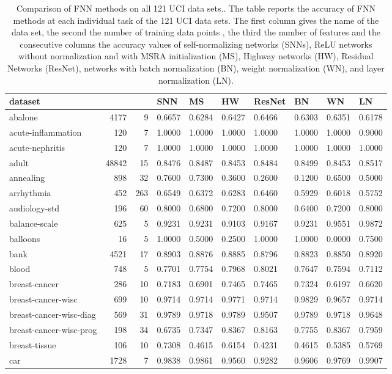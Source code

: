 \documentclass{article}
\begin{document}
\begin{table}
\caption[Comparison of FNN methods on all 121 UCI data sets.]{Comparison of FNN methods on all 121 UCI data sets.. The table reports the accuracy of FNN methods at each individual 
task of the 121 UCI data sets. The first column gives the name of the data set, the second the number
of training data points , the third the number of features  and the consecutive columns the accuracy values of
self-normalizing networks (SNNs), ReLU networks without normalization and with MSRA initialization (MS),
Highway networks (HW), Residual Networks (ResNet), networks with batch normalization (BN), weight 
normalization (WN), and layer normalization (LN). \label{tab:UCIfull}}
\footnotesize
\begin{tabular}{lrrlllllll}
\toprule
dataset &  &  & SNN & MS & HW & ResNet & BN & WN & LN\tabularnewline
\midrule
abalone & 4177 & 9 & 0.6657 & 0.6284 & 0.6427 & 0.6466 & 0.6303 & 0.6351 & 0.6178\tabularnewline
acute-inflammation & 120 & 7 & 1.0000 & 1.0000 & 1.0000 & 1.0000 & 1.0000 & 1.0000 & 0.9000\tabularnewline
acute-nephritis & 120 & 7 & 1.0000 & 1.0000 & 1.0000 & 1.0000 & 1.0000 & 1.0000 & 1.0000\tabularnewline
adult & 48842 & 15 & 0.8476 & 0.8487 & 0.8453 & 0.8484 & 0.8499 & 0.8453 & 0.8517\tabularnewline
annealing & 898 & 32 & 0.7600 & 0.7300 & 0.3600 & 0.2600 & 0.1200 & 0.6500 & 0.5000\tabularnewline
arrhythmia & 452 & 263 & 0.6549 & 0.6372 & 0.6283 & 0.6460 & 0.5929 & 0.6018 & 0.5752\tabularnewline
audiology-std & 196 & 60 & 0.8000 & 0.6800 & 0.7200 & 0.8000 & 0.6400 & 0.7200 & 0.8000\tabularnewline
balance-scale & 625 & 5 & 0.9231 & 0.9231 & 0.9103 & 0.9167 & 0.9231 & 0.9551 & 0.9872\tabularnewline
balloons & 16 & 5 & 1.0000 & 0.5000 & 0.2500 & 1.0000 & 1.0000 & 0.0000 & 0.7500\tabularnewline
bank & 4521 & 17 & 0.8903 & 0.8876 & 0.8885 & 0.8796 & 0.8823 & 0.8850 & 0.8920\tabularnewline
blood & 748 & 5 & 0.7701 & 0.7754 & 0.7968 & 0.8021 & 0.7647 & 0.7594 & 0.7112\tabularnewline
breast-cancer & 286 & 10 & 0.7183 & 0.6901 & 0.7465 & 0.7465 & 0.7324 & 0.6197 & 0.6620\tabularnewline
breast-cancer-wisc & 699 & 10 & 0.9714 & 0.9714 & 0.9771 & 0.9714 & 0.9829 & 0.9657 & 0.9714\tabularnewline
breast-cancer-wisc-diag & 569 & 31 & 0.9789 & 0.9718 & 0.9789 & 0.9507 & 0.9789 & 0.9718 & 0.9648\tabularnewline
breast-cancer-wisc-prog & 198 & 34 & 0.6735 & 0.7347 & 0.8367 & 0.8163 & 0.7755 & 0.8367 & 0.7959\tabularnewline
breast-tissue & 106 & 10 & 0.7308 & 0.4615 & 0.6154 & 0.4231 & 0.4615 & 0.5385 & 0.5769\tabularnewline
car & 1728 & 7 & 0.9838 & 0.9861 & 0.9560 & 0.9282 & 0.9606 & 0.9769 & 0.9907\tabularnewline

\end{tabular}
\end{table}
\end{document}

